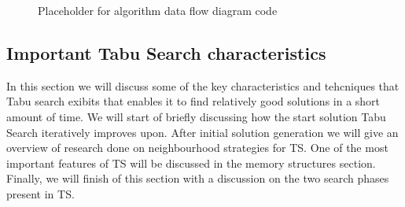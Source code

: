 \begin{figure}[htbp!]
	\centering
	\setlength \fboxsep{0pt}
	\setlength \fboxrule{0.5pt}
	\caption{Placeholder for algorithm data flow diagram code}
	\label{fig:TSFlowDiagram}
\end{figure}
\subsection{Important Tabu Search characteristics}
In this section we will discuss some of the key characteristics and tehcniques that Tabu search exibits that enables it to find relatively good solutions in a short amount of time. We will start of briefly discussing how the start solution Tabu Search iteratively improves upon. After initial solution generation we will give an overview of research done on neighbourhood strategies for TS. One of the most important features of TS will be discussed in the memory structures section. Finally, we will finish of this section with a discussion on the two search phases present in TS.

